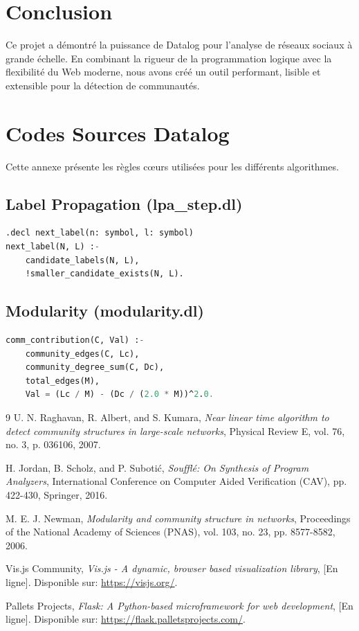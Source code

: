 \documentclass[12pt,a4paper]{report}
\begin{document}
\chapter{Conclusion}
Ce projet a démontré la puissance de Datalog pour l'analyse de réseaux sociaux à grande échelle. En combinant la rigueur de la programmation logique avec la flexibilité du Web moderne, nous avons créé un outil performant, lisible et extensible pour la détection de communautés.



\chapter{Codes Sources Datalog}
Cette annexe présente les règles cœurs utilisées pour les différents algorithmes.

\section{Label Propagation (lpa\_step.dl)}
\begin{lstlisting}[language=SQL]
.decl next_label(n: symbol, l: symbol)
next_label(N, L) :-
    candidate_labels(N, L),
    !smaller_candidate_exists(N, L).
\end{lstlisting}

\section{Modularity (modularity.dl)}
\begin{lstlisting}[language=SQL]
comm_contribution(C, Val) :-
    community_edges(C, Lc),
    community_degree_sum(C, Dc),
    total_edges(M),
    Val = (Lc / M) - (Dc / (2.0 * M))^2.0.
\end{lstlisting}

\clearpage
{}
\begin{thebibliography}{9}
U. N. Raghavan, R. Albert, and S. Kumara, 
\textit{Near linear time algorithm to detect community structures in large-scale networks}, 
Physical Review E, vol. 76, no. 3, p. 036106, 2007.

H. Jordan, B. Scholz, and P. Subotić, 
\textit{Soufflé: On Synthesis of Program Analyzers}, 
International Conference on Computer Aided Verification (CAV), pp. 422-430, Springer, 2016.

M. E. J. Newman, 
\textit{Modularity and community structure in networks}, 
Proceedings of the National Academy of Sciences (PNAS), vol. 103, no. 23, pp. 8577-8582, 2006.

Vis.js Community, 
\textit{Vis.js - A dynamic, browser based visualization library}, 
[En ligne]. Disponible sur: \url{https://visjs.org/}.

Pallets Projects, 
\textit{Flask: A Python-based microframework for web development}, 
[En ligne]. Disponible sur: \url{https://flask.palletsprojects.com/}.
\end{thebibliography}
\end{document}
